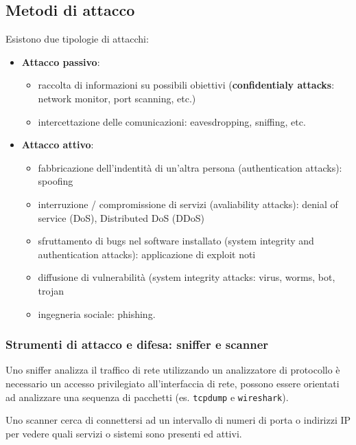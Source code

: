     \subsection{Metodi di attacco}
        Esistono due tipologie di attacchi:
        \begin{itemize}
            \item \textbf{Attacco passivo}:
            \begin{itemize}
                \item raccolta di informazioni su possibili obiettivi (\textbf{confidentialy attacks}: network monitor, port scanning, etc.)
                \item intercettazione delle comunicazioni: eavesdropping, sniffing, etc.
            \end{itemize}
            \item \textbf{Attacco attivo}:
            \begin{itemize}
                \item fabbricazione dell'indentità di un'altra persona (authentication attacks): spoofing
                \item interruzione / compromissione di servizi (avaliability attacks): denial of service (DoS), Distributed DoS (DDoS)
                \item sfruttamento di bugs nel software installato (system integrity and authentication attacks): applicazione di exploit noti
                \item diffusione di vulnerabilità (system integrity attacks: virus, worms, bot, trojan
                \item ingegneria sociale: phishing.
            \end{itemize}
        \end{itemize}

        \subsubsection{Strumenti di attacco e difesa: sniffer e scanner}
            Uno sniffer analizza il traffico di rete utilizzando un analizzatore di protocollo è necessario un accesso privilegiato all'interfaccia di rete, possono essere orientati ad analizzare una sequenza di pacchetti (es. \verb|tcpdump| e \verb|wireshark|).
        
            Uno scanner cerca di connettersi ad un intervallo di numeri di porta o indirizzi IP per vedere quali servizi o sistemi sono presenti ed attivi.
        
